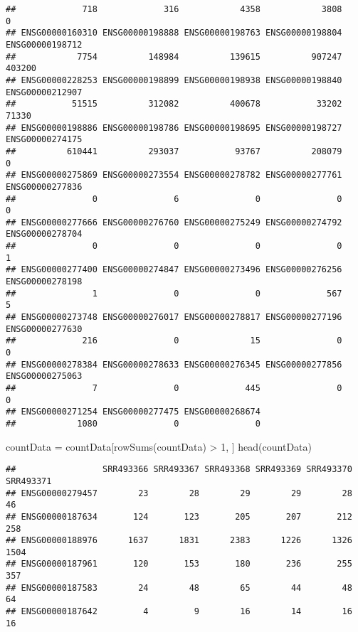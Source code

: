 \documentclass[
]{article}
\newenvironment{Shaded}{\begin{snugshade}}{\end{snugshade}}
\newcommand{\DecValTok}[1]{\textcolor[rgb]{0.00,0.00,0.81}{#1}}
\newcommand{\FunctionTok}[1]{\textcolor[rgb]{0.00,0.00,0.00}{#1}}
\newcommand{\NormalTok}[1]{#1}
\newcommand{\OtherTok}[1]{\textcolor[rgb]{0.56,0.35,0.01}{#1}}
\newcommand{\SpecialCharTok}[1]{\textcolor[rgb]{0.00,0.00,0.00}{#1}}
\begin{document}
\begin{verbatim}
##             718             316            4358            3808               0 
## ENSG00000160310 ENSG00000198888 ENSG00000198763 ENSG00000198804 ENSG00000198712 
##            7754          148984          139615          907247          403200 
## ENSG00000228253 ENSG00000198899 ENSG00000198938 ENSG00000198840 ENSG00000212907 
##           51515          312082          400678           33202           71330 
## ENSG00000198886 ENSG00000198786 ENSG00000198695 ENSG00000198727 ENSG00000274175 
##          610441          293037           93767          208079               0 
## ENSG00000275869 ENSG00000273554 ENSG00000278782 ENSG00000277761 ENSG00000277836 
##               0               6               0               0               0 
## ENSG00000277666 ENSG00000276760 ENSG00000275249 ENSG00000274792 ENSG00000278704 
##               0               0               0               0               1 
## ENSG00000277400 ENSG00000274847 ENSG00000273496 ENSG00000276256 ENSG00000278198 
##               1               0               0             567               5 
## ENSG00000273748 ENSG00000276017 ENSG00000278817 ENSG00000277196 ENSG00000277630 
##             216               0              15               0               0 
## ENSG00000278384 ENSG00000278633 ENSG00000276345 ENSG00000277856 ENSG00000275063 
##               7               0             445               0               0 
## ENSG00000271254 ENSG00000277475 ENSG00000268674 
##            1080               0               0
\end{verbatim}

\begin{Shaded}
\begin{Highlighting}[]
\NormalTok{countData }\OtherTok{=}\NormalTok{ countData[}\FunctionTok{rowSums}\NormalTok{(countData) }\SpecialCharTok{\textgreater{}} \DecValTok{1}\NormalTok{, ]}
\FunctionTok{head}\NormalTok{(countData)}
\end{Highlighting}
\end{Shaded}

\begin{verbatim}
##                 SRR493366 SRR493367 SRR493368 SRR493369 SRR493370 SRR493371
## ENSG00000279457        23        28        29        29        28        46
## ENSG00000187634       124       123       205       207       212       258
## ENSG00000188976      1637      1831      2383      1226      1326      1504
## ENSG00000187961       120       153       180       236       255       357
## ENSG00000187583        24        48        65        44        48        64
## ENSG00000187642         4         9        16        14        16        16
\end{verbatim}
\end{document}
